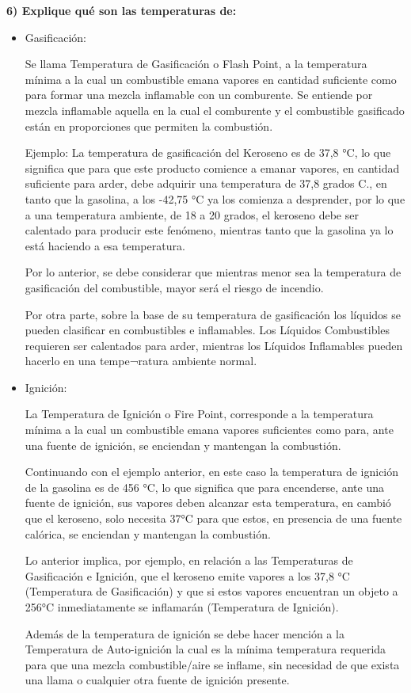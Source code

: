\documentclass[letterpaper,11pt]{article}
\begin{document}
\textbf{6) Explique qué son las temperaturas de:}
\begin{itemize}
	
    \item Gasificación:
    
     Se llama Temperatura de Gasificación o Flash Point, a la temperatura mínima a la cual un combustible emana vapores en cantidad suficiente como para formar una mezcla inflamable con un comburente. Se entiende por mezcla inflamable aquella en la cual el comburente y el combustible gasificado están en proporciones que permiten la combustión.
    
    Ejemplo: La temperatura de gasificación del Keroseno es de 37,8 °C, lo que significa que para que este producto comience a emanar vapores, en cantidad suficiente para arder, debe adquirir una temperatura de 37,8 grados C., en tanto que la gasolina, a los -42,75 °C ya los comienza a desprender, por lo que a una temperatura ambiente, de 18 a 20 grados, el keroseno debe ser calentado para producir este fenómeno, mientras tanto que la gasolina ya lo está haciendo a esa temperatura.
    
    Por lo anterior, se debe considerar que mientras menor sea la temperatura de gasificación del combustible, mayor será el riesgo de incendio.
    
    Por otra parte, sobre la base de su temperatura de gasificación los líquidos se pueden clasificar en combustibles e inflamables. Los Líquidos Combustibles requieren ser calentados para arder, mientras los Líquidos Inflamables pueden hacerlo en una tempe¬ratura ambiente normal.
    
    \item Ignición:
    
     La Temperatura de Ignición o Fire Point, corresponde a la temperatura mínima a la cual un combustible emana vapores suficientes como para, ante una fuente de ignición, se enciendan y mantengan la combustión.
    
    Continuando con el ejemplo anterior, en este caso la temperatura de ignición de la gasolina es de 456 °C, lo que significa que para encenderse, ante una fuente de ignición, sus vapores deben alcanzar esta temperatura, en cambió que el keroseno, solo necesita 37°C para que estos, en presencia de una fuente calórica, se enciendan y mantengan la combustión.
    
    Lo anterior implica, por ejemplo, en relación a las Temperaturas de Gasificación e Ignición, que el keroseno emite vapores a los 37,8 °C (Temperatura de Gasificación) y que si estos vapores encuentran un objeto a 256°C inmediatamente se inflamarán (Temperatura de Ignición).
    
    Además de la temperatura de ignición se debe hacer mención a la Temperatura de Auto-ignición la cual es la mínima temperatura requerida para que una mezcla combustible/aire se inflame, sin necesidad de que exista una llama o cualquier otra fuente de ignición presente.
    
    
\end{itemize}
\end{document}
